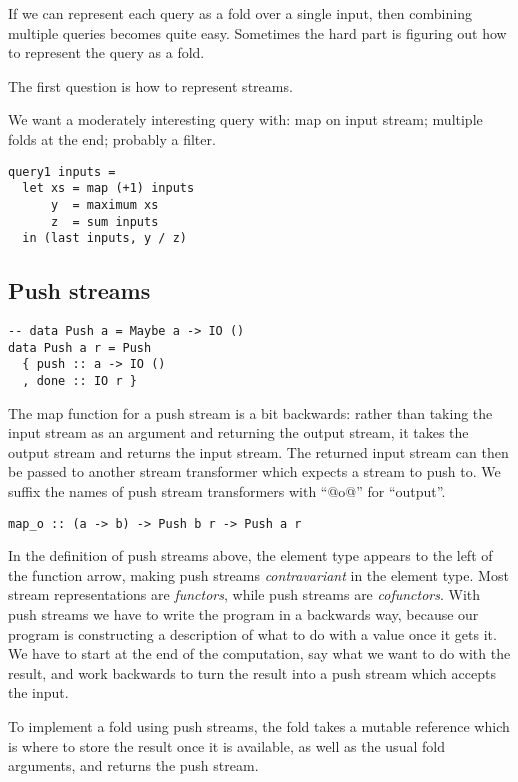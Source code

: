 


If we can represent each query as a fold over a single input, then combining multiple queries becomes quite easy.
Sometimes the hard part is figuring out how to represent the query as a fold.

The first question is how to represent streams.

We want a moderately interesting query with: map on input stream; multiple folds at the end; probably a filter.

\begin{lstlisting}
query1 inputs =
  let xs = map (+1) inputs
      y  = maximum xs
      z  = sum inputs
  in (last inputs, y / z)
\end{lstlisting}

\subsection{Push streams}


\begin{lstlisting}
-- data Push a = Maybe a -> IO ()
data Push a r = Push
  { push :: a -> IO ()
  , done :: IO r }
\end{lstlisting}

The map function for a push stream is a bit backwards: rather than taking the input stream as an argument and returning the output stream, it takes the output stream and returns the input stream.
The returned input stream can then be passed to another stream transformer which expects a stream to push to.
We suffix the names of push stream transformers with ``@o@'' for ``output''.

\begin{lstlisting}
map_o :: (a -> b) -> Push b r -> Push a r
\end{lstlisting}

In the definition of push streams above, the element type appears to the left of the function arrow, making push streams \emph{contravariant} in the element type.
Most stream representations are \emph{functors}, while push streams are \emph{cofunctors}.
With push streams we have to write the program in a backwards way, because our program is constructing a description of what to do with a value once it gets it.
We have to start at the end of the computation, say what we want to do with the result, and work backwards to turn the result into a push stream which accepts the input.

To implement a fold using push streams, the fold takes a mutable reference which is where to store the result once it is available, as well as the usual fold arguments, and returns the push stream.


